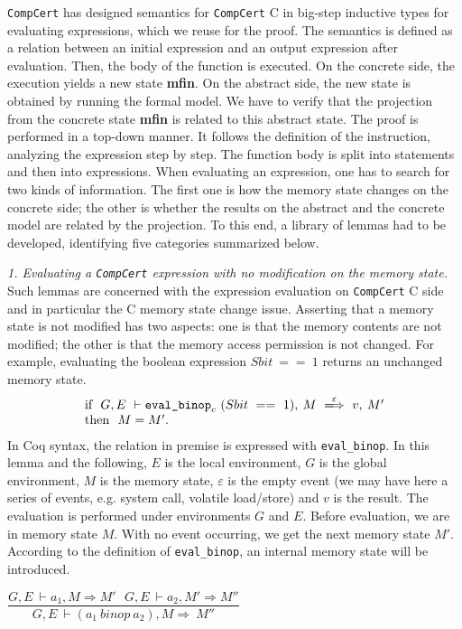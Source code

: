 \documentclass{llncs}
\newcommand{\compcert}{\texttt{CompCert}\xspace}
\begin{document}
\compcert has designed semantics for \compcert C in big-step inductive
types for evaluating expressions, which we reuse for the proof.  The
semantics is defined as a relation between an initial expression and
an output expression after evaluation.  Then, the body of the function
is executed.  On the concrete side, the execution yields a new state
\textbf{mfin}.  On the abstract side, the new state is
obtained by running the formal model.
We have to verify that the projection from the
concrete state \textbf{mfin} is related to this abstract
state.
The proof is performed in a top-down manner. It follows the definition
of the instruction, analyzing the expression step by step.  The
function body is split into statements and then into expressions.
When evaluating an expression, one has to search for two kinds of
information. The first one is how the memory state changes on the
concrete side; the other is whether the results on the abstract and
the concrete model are related by the projection.  To this end, a
library of lemmas had to be developed, identifying five categories
summarized below.

\medskip\noindent
  \textit{1. Evaluating a \compcert expression with no modification on the memory state.}\\
  Such lemmas are concerned with the expression evaluation on \compcert
  C side and in particular the C memory state change issue.  Asserting
  that a memory state is not modified has two aspects: one is that the
  memory contents are not modified; the other is that the memory
  access permission is not changed.  For example, evaluating the
  boolean expression $Sbit~==~1$ returns an unchanged memory state.
\[
\begin{array}{l}
\textrm{if}~~ G,E~\vdash \texttt{eval\_binop}_c~(Sbit~==~1),
\:M~\xLongrightarrow{\varepsilon}~v,\:M'
\\
\textrm{then}~~ M=M'.
\end{array}
\]
In Coq syntax, the relation in premise is expressed with
\texttt{eval\_binop}.
In this lemma and the following,
$E$ is the local environment, $G$ is the global environment, $M$ is
the memory state, $\varepsilon$ is the empty event
(we may have here a series of events, e.g. system call, volatile
load/store) and $v$ is the result.
The evaluation is performed under environments $G$ and $E$.  Before
evaluation, we are in memory state $M$.  With no event occurring, we
get the next memory state $M'$. According to the definition of
\texttt{eval\_binop}, an internal memory state will be introduced.
\begin{center}
$\dfrac
{G,E~\vdash a_1,M\Rightarrow M'~~~G,E~\vdash a_2,M'\Rightarrow M''
}
{G,E~\vdash (a_1~binop~a_2),M\Rightarrow~M''}$
\end{center}
\end{document}
